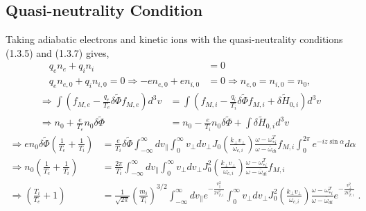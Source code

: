 \documentclass[12pt]{article}
\numberwithin{equation}{subsection}
\begin{document}
\subsection{Quasi-neutrality Condition}
   \quad Taking adiabatic electrons and kinetic ions with the quasi-neutrality conditions (1.3.5) and (1.3.7) gives,
   \begin{equation}
   \begin{aligned}
      q_en_e     + q_in_i     &= 0 \\
      q_en_{e,0} + q_in_{i,0} = 0 \Rightarrow -en_{e,0} + en_{i,0} &= 0 \Rightarrow n_{e,0} = n_{i,0} = n_0,
   \end{aligned}
   \end{equation}
   \begin{equation}
   \begin{aligned}
      \Rightarrow \int(f_{M,e}-\frac{q_e}{T_e}\delta\widetilde{\Phi}f_{M,e})d^3v
                 &= \int(f_{M,i} - \frac{q_i}{T_i}\delta\widetilde{\Phi}f_{M,i} + \delta\widetilde{H}_{0,i})d^3v \\
      \Rightarrow n_0 + \frac{e}{T_e}n_0\delta\widetilde{\Phi}
                 &= n_0 - \frac{e}{T_i}n_0\delta\widetilde{\Phi} + \int\delta\widetilde{H}_{0,i}d^3v
   \end{aligned}
   \end{equation}
   \begin{equation}
   \begin{aligned}
      \Rightarrow  en_0\delta\widetilde{\Phi}(\frac{1}{T_e} + \frac{1}{T_i})
                &= \frac{e}{T_i}\delta\widetilde{\Phi}\int_{-\infty}^{\infty}dv_\parallel\int_{0}^{\infty}v_\perp dv_\perp
                   J_0(\frac{k_\perp v_\perp}{\omega_{c,i}})\frac{\omega - \omega_{*i}^T}{\omega - \bar{\omega}_{di}}f_{M,i}\int_{0}^{2\pi}e^{-iz\sin\alpha}d\alpha \\
      \Rightarrow n_0(\frac{1}{T_e} + \frac{1}{T_i}) &= \frac{2\pi}{T_i}\int_{-\infty}^{\infty}dv_\parallel\int_{0}^{\infty}v_\perp dv_\perp
                  J_0^2(\frac{k_\perp v_\perp}{\omega_{c,i}})\frac{\omega - \omega_{*i}^T}{\omega - \bar{\omega}_{di}}f_{M,i} \\
      \Rightarrow (\frac{T_i}{T_e} + 1) &= \frac{1}{\sqrt{2\pi}}\left(\frac{m_i}{T_i}\right)^{3/2}\int_{-\infty}^{\infty}dv_\parallel e^{-\frac{v_\parallel^2}{2v^2_{T,i}}}
                  \int_{0}^{\infty}v_\perp dv_\perp J_0^2(\frac{k_\perp v_\perp}{\omega_{c,i}})\frac{\omega - \omega_{*i}^T}{\omega - \bar{\omega}_{di}}e^{-\frac{v_\perp^2}{2v^2_{T,i}}}\;.
   \end{aligned}
   \end{equation}
\end{document}
